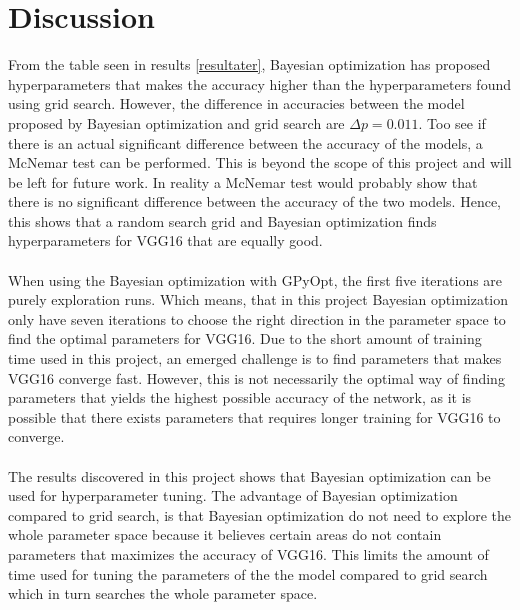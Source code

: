 \documentclass[12pt,fleqn]{article}
\begin{document}
\section{Discussion}

From the table seen in results \ref{resultater}, Bayesian optimization has proposed hyperparameters that makes the accuracy higher than the hyperparameters found using grid search. However, the difference in accuracies between the model proposed by Bayesian optimization and grid search are $ \Delta p = 0.011$. Too see if there is an actual significant difference between the accuracy of the models, a McNemar test can be performed. This is beyond the scope of this project and will be left for future work. In reality a McNemar test would probably show that there is no significant difference between the accuracy of the two models. Hence, this shows that a random search grid and Bayesian optimization finds hyperparameters for VGG16 that are equally good.
\\\\
When using the Bayesian optimization with GPyOpt, the first five iterations are purely exploration runs. Which means, that in this project Bayesian optimization only have seven iterations to choose the right direction in the parameter space to find the optimal parameters for VGG16. Due to the short amount of training time used in this project, an emerged challenge is to find parameters that makes VGG16 converge fast. However, this is not necessarily the optimal way of finding parameters that yields the highest possible accuracy of the network, as it is possible that there exists parameters that requires longer training for VGG16 to converge.
\\\\
The results discovered in this project shows that Bayesian optimization can be used for hyperparameter tuning. The advantage of Bayesian optimization compared to grid search, is that Bayesian optimization do not need to explore the whole parameter space because it believes certain areas do not contain parameters that maximizes the accuracy of VGG16. This limits the amount of time used for tuning the parameters of the the model compared to grid search which in turn searches the whole parameter space.
\end{document}
